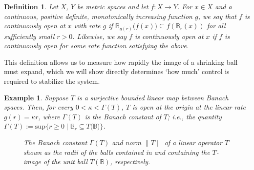 \documentclass[pdflatex,sn-mathphys-num]{sn-jnl}%
\newcommand{\R}
    {
        \mathbb{R}
    }
\theoremstyle{thmstyleone}%
\theoremstyle{thmstyletwo}%
\newtheorem{example}{Example}%
\theoremstyle{thmstylethree}%
\newtheorem{definition}{Definition}%
\begin{document}
    
    \begin{definition}\label{cont open def}
        Let $X$, $Y$ be metric spaces and let $f:X \rightarrow Y$.  For $x \in X$ and a continuous, positive definite, monotonically increasing function $ g $, we say that \emph{$f$ is continuously open at $x$ with rate $g$} if $\mathbb{B}_{g(r)}\big(f(x)\big)\subseteq f(\mathbb{B}_r(x))$ for all sufficiently small $r>0$.  Likewise, we say $f$ is \emph{continuously open at $x$} if $f$ is continuously open for some rate function satisfying the above.
    \end{definition}


    This definition allows us to measure how rapidly the image of a shrinking ball must expand, which we will show directly determines `how much' control is required to stabilize the system.
    
    
    \begin{example}\label{bconstant example}
        Suppose $T$ is a surjective bounded linear map between Banach spaces. Then, for every $0<\kappa<\Gamma(T)$, $T$ is open at the origin at the linear rate $g(r)=\kappa r$, where $\Gamma(T)$ is the Banach constant of $T$; i.e., the quantity $\Gamma(T):=\mathrm{sup}\big\{r\geq 0\;\big|\;\mathbb{B}_r\subseteq T\big(\mathbb{B}\big)\big \}$.

        \begin{figure}
            \caption{The Banach constant $\Gamma(T)$ and norm $\|T\|$ of a linear operator $T$ shown as the radii of the balls contained in and containing the $T$-image of the unit ball $T(\mathbb{B})$, respectively.} \label{b constant fig} 
        \end{figure}
    \end{example}
    
\end{document}
